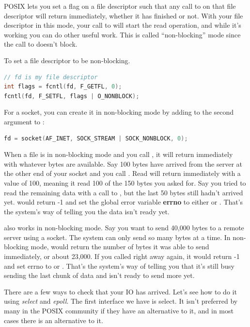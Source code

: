 POSIX lets you set a flag on a file descriptor such that any call to  on that file descriptor will return immediately, whether it has finished or not.
With your file descriptor in this mode, your call to  will start the read operation, and while it's working you can do other useful work.
This is called ``non-blocking'' mode since the call to  doesn't block.

To set a file descriptor to be non-blocking.

\begin{lstlisting}[language=C]
// fd is my file descriptor
int flags = fcntl(fd, F_GETFL, 0);
fcntl(fd, F_SETFL, flags | O_NONBLOCK);
\end{lstlisting}

For a socket, you can create it in non-blocking mode by adding  to the second argument to :

\begin{lstlisting}[language=C]
fd = socket(AF_INET, SOCK_STREAM | SOCK_NONBLOCK, 0);
\end{lstlisting}

When a file is in non-blocking mode and you call , it will return immediately with whatever bytes are available.
Say 100 bytes have arrived from the server at the other end of your socket and you call .
Read will return immediately with a value of 100, meaning it read 100 of the 150 bytes you asked for.
Say you tried to read the remaining data with a call to , but the last 50 bytes still hadn't arrived yet.
 would return -1 and set the global error variable \textbf{errno} to either  or .
That's the system's way of telling you the data isn't ready yet.

 also works in non-blocking mode.
Say you want to send 40,000 bytes to a remote server using a socket.
The system can only send so many bytes at a time.
In non-blocking mode,  would return the number of bytes it was able to send immediately, or about 23,000.
If you called  right away again, it would return -1 and set errno to  or .
That's the system's way of telling you that it's still busy sending the last chunk of data and isn't ready to send more yet.

There are a few ways to check that your IO has arrived.
Let's see how to do it using \emph{select} and \emph{epoll}.
The first interface we have is select.
It isn't preferred by many in the POSIX community if they have an alternative to it, and in most cases there is an alternative to it.

